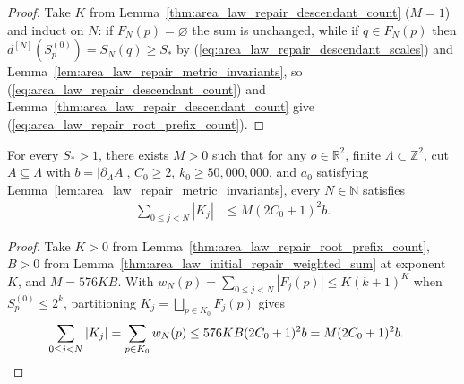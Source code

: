 \begin{proof}
    \leanok
    Take $K$ from Lemma~\ref{thm:area_law_repair_descendant_count} ($M=1$) and induct on $N$:
    if $F_N(p)=\varnothing$ the sum is unchanged, while if $q\in F_N(p)$ then
    $d^{[N]}(S_p^{(0)})=S_N(q)\ge S_*$ by (\ref{eq:area_law_repair_descendant_scales}) and
    Lemma~\ref{lem:area_law_repair_metric_invariants}, so (\ref{eq:area_law_repair_descendant_count})
    and Lemma~\ref{thm:area_law_repair_descendant_count} give (\ref{eq:area_law_repair_root_prefix_count}).
\end{proof}

\begin{lemma}
    \label{thm:area_law_repair_total_mark_prefix_count}
    \leanok
    For every $S_*>1$, there exists $M>0$ such that for any $o\in\mathbb R^2$, finite
    $\Lambda\subset\mathbb Z^2$, cut $A\subseteq\Lambda$ with $b=|\partial_\Lambda A|$,
    $C_0\ge2$, $k_0\ge50{,}000{,}000$, and $a_0$ satisfying Lemma~\ref{lem:area_law_repair_metric_invariants},
    every $N\in\mathbb N$ satisfies
    \begin{align}
        \sum_{0\le j<N}|K_j| & \le M(2C_0+1)^2b.
        \label{eq:area_law_repair_total_mark_prefix_count}
    \end{align}
\end{lemma}

\begin{proof}
    \leanok
    Take $K>0$ from Lemma~\ref{thm:area_law_repair_root_prefix_count}, $B>0$ from
    Lemma~\ref{thm:area_law_initial_repair_weighted_sum} at exponent $K$, and $M=576KB$.
    With $w_N(p)=\sum_{0\le j<N}|F_j(p)|\le K(k+1)^K$ when $S_p^{(0)}\le2^k$, partitioning
    $K_j=\bigsqcup_{p\in K_0}F_j(p)$ gives
    \begin{align}
        \sum_{0\le j<N}|K_j|
         & =\sum_{p\in K_0}w_N(p)\le576KB(2C_0+1)^2b=M(2C_0+1)^2b.\notag
    \end{align}
\end{proof}

